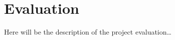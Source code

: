\chapter{Evaluation}

Here will be the description of the project evaluation\ldots

\nlipsum


\begin{comment}
To evaluate this project's hypotheses~(see \secref{hypotheses}), both versions of the developed tool will be subjected to a number of user studies. Currently, however, the presumed user base is limited to only a small number of researchers. Luckily, project supervisors Klau and El-Kebir keep a close connection with most of those researchers, who work at VU University Amsterdam. They have shown some interest in the tool and are willing to participate in the user studies. Furthermore, as some of the researchers are also teaching, they can ask some of their students to evaluate the tool as well. It is not possible to ask random students, as they will lack domain knowledge, making their results unreliable~\cite{jonassen2000toward}. The researchers' students are considered to have enough domain knowledge to be able to correctly parameterise a molecule.

In the user studies, the test subjects will be split up in two groups, where each subject is randomly assigned to a group and both groups are of equal size and equal student-scientist ratio. This way, it is made sure that both groups are representative, which is essential for user studies~\cite{wohlin2003empirical}~(see also \secref{user_studies}).

The groups will take part in an experiment that compares the two versions of the molecule parameterisation tool~\cite{wohlin2003empirical}. One group will test the naive version, the other will use the smart one. For both groups, every member will be asked to parameterise a few molecules of increasing size and complexity. The first one will be quite easy to complete, but the last one should be of such complexity that, theoretically, using the tool is beneficial over using conventional quantum mechanical calculations. It is in these last situations that the tool should show its true value.

During the tasks, the time required to complete the parameterisation will be measured. The difference between the time required in the two implementations will help deciding which of the two implementations is better, but, for both tools, completing the parameterisation should definitely not take hours to finish. Furthermore, users should not report they are annoyed by the tool or willing to stop parameterising.


\end{comment}
